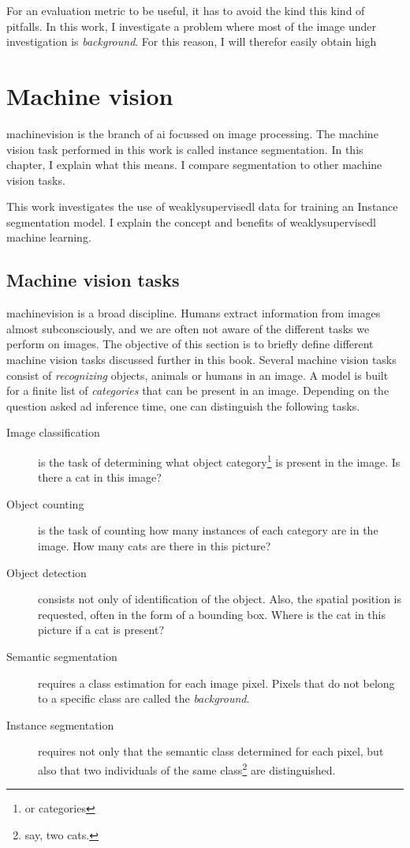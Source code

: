 For an evaluation metric to be useful, it has to avoid the kind this kind of pitfalls.
In this work, I investigate a problem where most of the image under investigation is \textit{background}. 
For this reason, I will therefor easily obtain high

\section{Machine vision}

\Gls{machinevision} is the branch of \Gls{ai} focussed on image processing.
The machine vision task performed in this work is called instance \Gls{segmentation}.
In this chapter, I explain what this means. 
I compare segmentation to other machine vision tasks.

This work investigates the use of \Gls{weaklysupervisedl} data for training an Instance segmentation model. 
I explain the concept and benefits of \Gls{weaklysupervisedl} machine learning.

\subsection{Machine vision tasks \label{sec:machinevisiontasks}}

\Gls{machinevision} is a broad discipline. 
Humans extract information from images almost subconsciously, and we are often not aware of the different tasks we perform on images.
The objective of this section is to briefly define different machine vision tasks discussed further in this book. 
Several machine vision tasks consist of \textit{recognizing} objects, animals or humans in an image.
A model is built for a finite list of \textit{categories} that can be present in an image.
Depending on the question asked ad inference time, one can distinguish the following tasks.

\begin{description}
    \item[Image classification] is the task of determining what object category\footnote{or categories} is present in the image. Is there a cat in this image?
    \item[Object counting] is the task of counting how many instances of each category are in the image. How many cats are there in this picture? 
    \item[Object detection] consists not only of identification of the object. Also, the spatial position is requested, often in the form of a bounding box. Where is the cat in this picture if a cat is present?
    \item[Semantic segmentation] requires a class estimation for each image pixel. Pixels that do not belong to a specific class are called the \textit{background}.
    \item[Instance segmentation] requires not only that the semantic class determined for each pixel, but also that two individuals of the same class\footnote{say, two cats.} are distinguished.   
\end{description}

